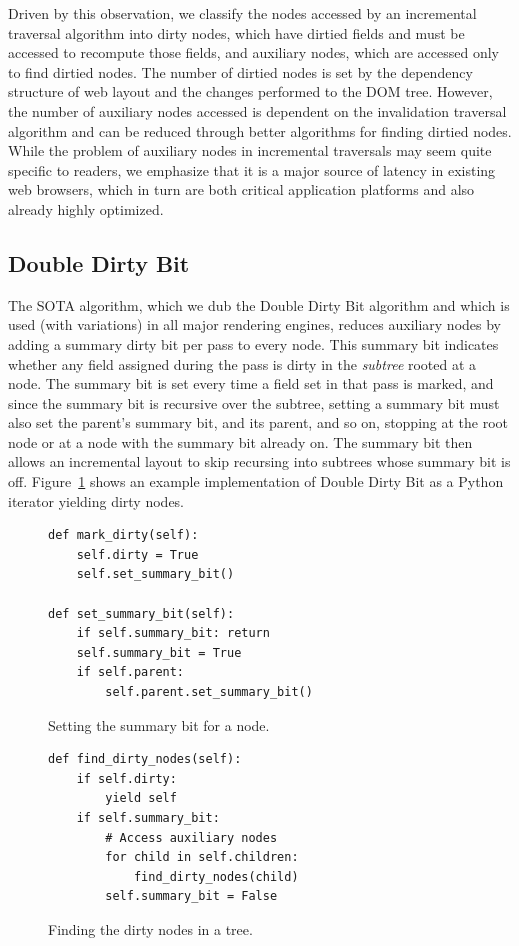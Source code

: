 Driven by this observation, we classify the nodes
  accessed by an incremental traversal algorithm
  into dirty nodes, which have dirtied fields
  and must be accessed to recompute those fields,
  and auxiliary nodes,
  which are accessed only to find dirtied nodes.
The number of dirtied nodes is set by
  the dependency structure of web layout
  and the changes performed to the DOM tree.
However, the number of auxiliary nodes accessed
  is dependent on the invalidation traversal algorithm
  and can be reduced through better algorithms for finding dirtied nodes.
While the problem of auxiliary nodes
  in incremental traversals may seem quite specific to readers,
  we emphasize that it is
  a major source of latency in existing web browsers,
  which in turn are both critical application platforms
  and also already highly optimized.

\subsection{Double Dirty Bit}
The SOTA algorithm,
  which we dub the Double Dirty Bit algorithm
  and which is used (with variations) in all major rendering engines,
  reduces auxiliary nodes by adding a summary dirty bit per pass
  to every node.
This summary bit indicates whether any field assigned during the pass
  is dirty in the \emph{subtree} rooted at a node.
The summary bit is set every time a field set in that pass is marked,
  and since the summary bit is recursive over the subtree,
  setting a summary bit must also set the parent's summary bit,
  and its parent, and so on, stopping at the root node
  or at a node with the summary bit already on.
The summary bit then allows an incremental layout
  to skip recursing into subtrees
  whose summary bit is off.
Figure~\ref{fig:find-dirty-nodes} shows an example implementation
  of Double Dirty Bit
  as a Python iterator yielding dirty nodes.

\begin{figure}
\begin{minipage}[b]{0.5\linewidth}
\begin{verbatim}
def mark_dirty(self):
    self.dirty = True
    self.set_summary_bit()

def set_summary_bit(self):
    if self.summary_bit: return
    self.summary_bit = True
    if self.parent:
        self.parent.set_summary_bit()
\end{verbatim}
\caption{Setting the summary bit for a node.}
\label{fig:set-summary-bits}
\end{minipage}\hfill%
\begin{minipage}[b]{0.5\linewidth}
\begin{verbatim}
def find_dirty_nodes(self):
    if self.dirty:
        yield self
    if self.summary_bit:
        # Access auxiliary nodes
        for child in self.children:
            find_dirty_nodes(child)
        self.summary_bit = False
\end{verbatim}
\caption{Finding the dirty nodes in a tree.}
\label{fig:find-dirty-nodes}
\end{minipage}
\end{figure}

